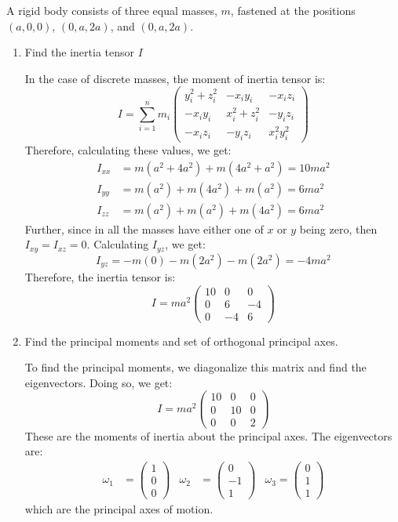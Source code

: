 \documentclass[10pt]{article}
\begin{document}
	A rigid body consists of three equal masses, $m$, fastened at the positions $(a, 0, 0)$, $(0, a, 2a)$, and
	$(0, a, 2a)$. 
	\begin{enumerate}[label=\alph*)]
		\item Find the inertia tensor $I$

			\begin{solution}
				In the case of discrete masses, the moment of inertia tensor is: 
				\[
					I = \sum_{i = 1}^n m_i \begin{pmatrix} y_{i}^2 + z_i^2 & -x_{i}y_{i}& -x_{i}z_i\\
					-x_{i}y_{i} & x_{i}^2 + z_i^2 &- y_{i}z_i\\
					-x_{i}z_i & -y_iz_i & x_{i}^2y_{i}^2
				\end{pmatrix} 
				\] 
				Therefore, calculating these values, we get:
				\begin{align*}
					I_{xx} &= m(a^2 + 4a^2) + m(4a^2 + a^2) = 10ma^2\\
					I_{yy} &= m(a^2) + m(4a^2) + m(a^2) = 6ma^2 \\
					I_{zz} &=  m(a^2) + m(a^2) + m(4a^2) = 6ma^2 
				\end{align*}
				Further, since in all the masses have either one of $x$ or $y$ being zero, then $I_{xy} = 
				I_{xz} = 0$. Calculating $I_{yz}$, we get:
				\[
					I_{yz} = -m(0) - m(2a^2) - m(2a^2) = -4ma^2
				\] 
				Therefore, the inertia tensor is: 
				\[
					I = ma^2 \begin{pmatrix} 10 & 0 & 0\\
					0 & 6 & -4\\
					0 & -4 & 6\end{pmatrix} 
				\] 
			\end{solution}
		\item Find the principal moments and set of orthogonal principal axes.

			\begin{solution}
				To find the principal moments, we diagonalize this matrix and find the eigenvectors. Doing so, 
				we get:
				\[
					I = ma^2 \begin{pmatrix} 10 & 0 & 0\\
					0 & 10 & 0\\
					0 & 0 & 2
				\end{pmatrix} 
				\] 
				These are the moments of inertia about the principal axes. The eigenvectors are: 
				\begin{align*}
					\omega_1 &= \begin{pmatrix} 1\\0\\0 \end{pmatrix} & \omega_2 &= \begin{pmatrix} 0 \\ -1 \\ 1
				\end{pmatrix} & \omega_3 = \begin{pmatrix} 0\\1 \\1 \end{pmatrix} 
				\end{align*}
				which are the principal axes of motion. 
			\end{solution}
	\end{enumerate}
\end{document}
